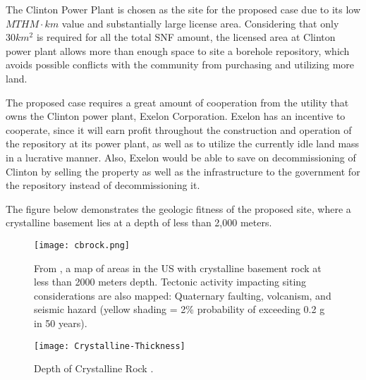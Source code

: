 
The Clinton Power Plant is chosen as the site for the proposed case due to its
        low $MTHM\cdot km$ value and substantially large license 
        area\cite{nrc_chapter_2007}.
 Considering that only
 $30km^2$ is required for all the total \gls{SNF} amount, the licensed area at Clinton
  power plant allows more than  enough space to site a borehole repository, which
   avoids possible conflicts with the community from purchasing and utilizing more
    land. 
  
  The proposed case requires a great amount of cooperation from the utility that owns
  the Clinton power plant, Exelon Corporation. 
  Exelon has an incentive to cooperate,
  since it will earn profit throughout the construction and operation of the 
  repository at its power plant, as well as to utilize the currently idle land mass
  in a lucrative manner. Also, Exelon would be able to save on decommissioning of
  Clinton by selling the property as well as the infrastructure to the government 
  for the repository instead of decommissioning it.  
  
  
  
  The figure below demonstrates the geologic fitness of the proposed site, where 
  a crystalline basement lies at a depth of less than 2,000 meters.



\begin{figure}[!h] 
  \centering
  \texttt{[image: cbrock.png]}	
        \caption{From \cite{perry_gis_2015}, a map of areas in the US with 
        crystalline basement rock at less than 2000 meters depth. Tectonic 
        activity impacting siting considerations are also mapped:  Quaternary 
        faulting, volcanism, and seismic hazard (yellow shading = 2\% 
        probability of exceeding 0.2 g in 50 years).}
  \label{fig:cbrock}
\end{figure}

  
  \iffalse

\begin{figure}[!h] 
  \centering
  \texttt{[image: Crystalline-Thickness]}	
  \caption{Depth of Crystalline Rock
  \cite{perry_gis_2015}.}
  \label{fig:Depth}
\end{figure}

